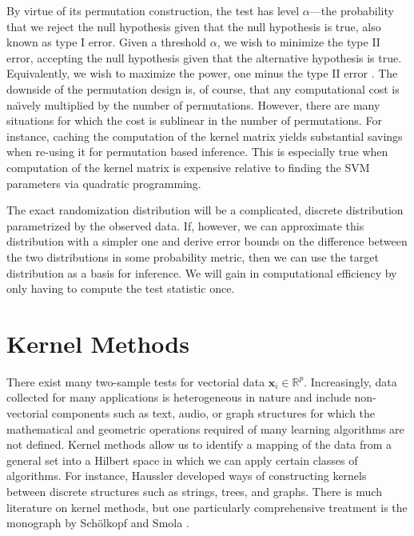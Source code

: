 By virtue of its permutation construction, the test has level $\alpha$---the
probability that we reject the null hypothesis given
that the null hypothesis is true, also known as type I error.  Given a
threshold $\alpha$, we wish to minimize the type II error, accepting
the null hypothesis given that the alternative hypothesis is true.
Equivalently, we wish to maximize the power, one minus the type II
error \cite{lehmann2005testing}.  The downside of the permutation
design is, of course, that any computational cost is na\"\i vely
multiplied by the number of permutations.  However, there are many
situations for which the cost is sublinear in the number of
permutations.  For instance, caching the computation of the kernel matrix
yields substantial savings when re-using it for permutation based
inference.  This is especially true when computation of the kernel
matrix is expensive relative to finding the SVM parameters via
quadratic programming.

The exact randomization distribution will be a complicated, discrete distribution
parametrized by the observed data.  If, however, we can approximate this
distribution with a simpler one and derive error bounds on the difference
between the two distributions in some probability metric, then we can
use the target distribution as a basis for inference.  We will gain in
computational efficiency by only having to compute the test statistic once.

\section{Kernel Methods}
There exist many two-sample tests for vectorial data $\mathbf{x}_i \in
\mathbb{R}^p$.  Increasingly, data collected for many applications is
heterogeneous in nature and include non-vectorial components such as
text, audio, or graph structures for which the mathematical and
geometric operations required of many learning algorithms are not
defined.  Kernel methods allow us to identify a mapping of the data
from a general set into a Hilbert space in which we can apply certain
classes of algorithms.  For instance, Haussler
\cite{Haussler1999Convolution} developed ways of constructing kernels
between discrete structures such as strings, trees, and graphs.  There
is much literature on kernel methods, but one particularly
comprehensive treatment is the monograph by Sch{\"o}lkopf and Smola
\cite{scholkopf2002learning}.

